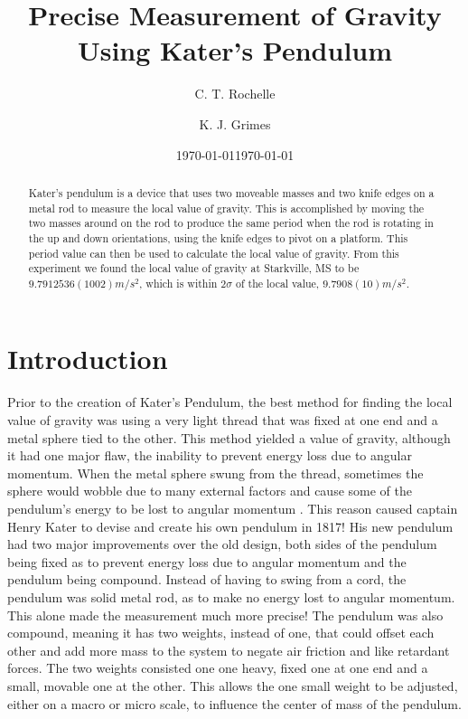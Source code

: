 \documentclass[aps,prl,10pt,twocolumn,floatfix]{revtex4-2}
\begin{document}
\begin{abstract}
Kater's pendulum is a device that uses two moveable masses and two knife edges on a metal rod to measure the local value of gravity. 
This is accomplished by moving the two masses around on the rod to produce the same period when the rod is rotating in the up and down orientations, using the knife edges to pivot on a platform. 
This period value can then be used to calculate the local value of gravity.
From this experiment we found the local value of gravity at Starkville, MS to be $9.7912536(1002)m/s^2$, which is within $2\sigma$ of the local value, $9.7908(10)m/s^2$.
\end{abstract}


\title{Precise Measurement of Gravity Using Kater's Pendulum}
\author{C. T. Rochelle}
\author{K. J. Grimes}
\date{\today}
\date{\today}

\maketitle

\section{Introduction}\label{Intro}
Prior to the creation of Kater's Pendulum, the best method for finding the local value of gravity was using a very light thread that was fixed at one end and a metal sphere tied to the other. 
This method yielded a value of gravity, although it had one major flaw, the inability to prevent energy loss due to angular momentum.
When the metal sphere swung from the thread, sometimes the sphere would wobble due to many external factors and cause some of the pendulum's energy to be lost to angular momentum \cite{BeforeKater}. 
This reason caused captain Henry Kater to devise and create his own pendulum in 1817\cite{KatersWork}!
His new pendulum had two major improvements over the old design, both sides of the pendulum being fixed as to prevent energy loss due to angular momentum and the pendulum being compound. 
Instead of having to swing from a cord, the pendulum was solid metal rod, as to make no energy lost to angular momentum. 
This alone made the measurement much more precise!
The pendulum was also compound, meaning it has two weights, instead of one, that could offset each other and add more mass to the system to negate air friction and like retardant forces. 
The two weights consisted one one heavy, fixed one at one end and a small, movable one at the other. 
This allows the one small weight to be adjusted, either on a macro or micro scale, to influence the center of mass of the pendulum.
\end{document}
